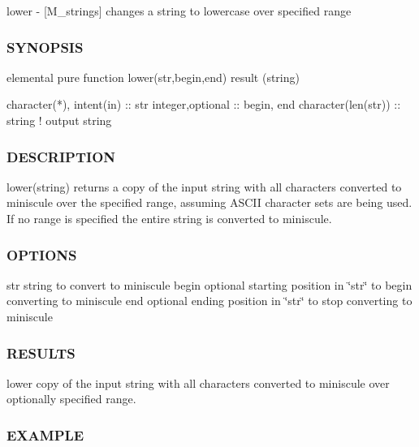 lower -\/ \mbox{[}M\+\_\+strings\mbox{]} changes a string to lowercase over specified range 

\subsubsection*{S\+Y\+N\+O\+P\+S\+IS}

\begin{DoxyVerb}elemental pure function lower(str,begin,end) result (string)

 character(*), intent(in) :: str
 integer,optional         :: begin, end
 character(len(str))      :: string  ! output string
\end{DoxyVerb}


\subsubsection*{D\+E\+S\+C\+R\+I\+P\+T\+I\+ON}

lower(string) returns a copy of the input string with all characters converted to miniscule over the specified range, assuming A\+S\+C\+II character sets are being used. If no range is specified the entire string is converted to miniscule.

\subsubsection*{O\+P\+T\+I\+O\+NS}

str string to convert to miniscule begin optional starting position in \char`\"{}str\char`\"{} to begin converting to miniscule end optional ending position in \char`\"{}str\char`\"{} to stop converting to miniscule

\subsubsection*{R\+E\+S\+U\+L\+TS}

lower copy of the input string with all characters converted to miniscule over optionally specified range.

\subsubsection*{E\+X\+A\+M\+P\+LE}

